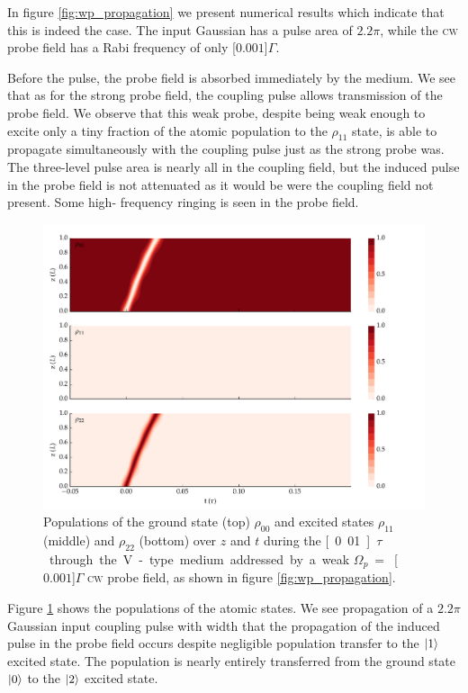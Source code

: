     In figure \ref{fig:wp_propagation} we present numerical results which
    indicate that this is indeed the case. The input Gaussian has a pulse area
    of $2.2\pi$, while the \textsc{cw} probe field has a Rabi frequency of only
    \unit[$0.001$]{$\Gamma$}.

    Before the pulse, the probe field is absorbed immediately by the medium. We
    see that as for the strong probe field, the coupling pulse allows
    transmission of the probe field. We observe that this weak probe, despite
    being weak enough to excite only a tiny fraction of the atomic population to
    the $\rho_{11}$ state, is able to propagate simultaneously with the coupling
    pulse just as the strong probe was. The three-level pulse area is nearly
    all in the coupling field, but the induced pulse in the probe field is not
    attenuated as it would be were the coupling field not present. Some high-
    frequency ringing is seen in the probe field.
    \begin{figure}[]
      \includegraphics[width=\linewidth]
        {figs/06_simultons/mb_vee_wpsit_plot_001c_22pip_Ng1e3_fig2.pdf}
      \caption{
      Populations of the ground state (top) $\rho_{00}$ and excited states
      $\rho_{11}$ (middle) and $\rho_{22}$ (bottom) over $z$ and $t$ during the
      \unit[0.01]{$\tau$} through the V-type medium addressed by a weak
      $\Omega_p~=$~\unit[$0.001$]{$\Gamma$} \textsc{cw} probe field, as shown in
      figure \ref{fig:wp_propagation}.
      } 
      \label{fig:wp_pops} 
    \end{figure}

    Figure \ref{fig:wp_pops} shows the populations of the atomic states. We see
    propagation of a $2.2\pi$ Gaussian input coupling pulse with width that the
    propagation of the induced pulse in the probe field occurs despite
    negligible population transfer to the $\Ket{1}$ excited state. The
    population is nearly entirely transferred from the ground state $\Ket{0}$ to
    the $\Ket{2}$ excited state.

